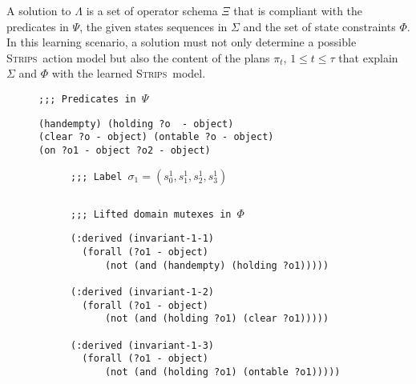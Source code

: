 \documentclass{article}
\newcommand{\strips}{\textsc{Strips}}     %
\begin{document}
A solution to $\Lambda$ is a set of operator schema $\Xi$ that is compliant with the predicates in $\Psi$, the given states sequences in $\Sigma$ and the set of state constraints $\Phi$. In this learning scenario, a solution must not only determine a possible \strips\ action model but also the content of the plans $\pi_t$, {\tt\small $1\leq t\leq \tau$} that explain $\Sigma$ and $\Phi$ with the learned \strips\ model. 

\begin{figure}
{\tt ;;; Predicates in $\Psi$}
\begin{footnotesize}
\begin{verbatim}
(handempty) (holding ?o  - object)
(clear ?o - object) (ontable ?o - object)
(on ?o1 - object ?o2 - object)
\end{verbatim}
\end{footnotesize}

\vspace{0.2cm}

\begin{subfigure}{.6\textwidth}
{\tt ;;; Label $\sigma_1=(s_0^1,s_1^1,s_2^1,s_3^1)$}
\begin{lstlisting}[mathescape]
\end{lstlisting}
\vspace{0.1cm}
\vspace{0.6cm}
\end{subfigure}%

\begin{footnotesize}
\begin{subfigure}{.6\textwidth}
{\tt ;;; Lifted domain mutexes in $\Phi$}
\begin{verbatim}
(:derived (invariant-1-1)
  (forall (?o1 - object)
      (not (and (handempty) (holding ?o1)))))

(:derived (invariant-1-2)
  (forall (?o1 - object)
      (not (and (holding ?o1) (clear ?o1)))))

(:derived (invariant-1-3)
  (forall (?o1 - object)
      (not (and (holding ?o1) (ontable ?o1)))))


\end{verbatim}
\end{subfigure}
\end{footnotesize}
\end{figure}
\end{document}
